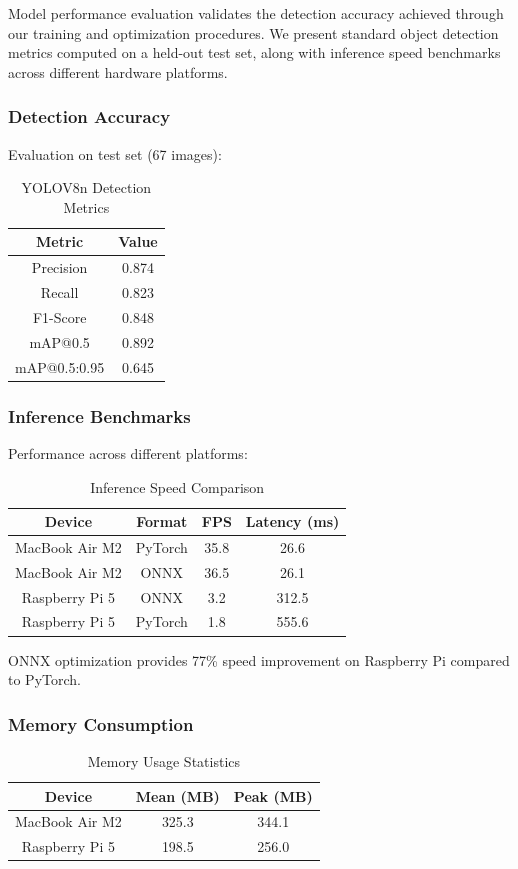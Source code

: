 \documentclass{ieeeaccess}
\begin{document}
Model performance evaluation validates the detection accuracy achieved through our training and optimization procedures. We present standard object detection metrics computed on a held-out test set, along with inference speed benchmarks across different hardware platforms.

\subsubsection{Detection Accuracy}
Evaluation on test set (67 images):
\begin{table}[h]
\caption{YOLOV8n Detection Metrics}
\centering
\begin{tabular}{@{}cc@{}}
\toprule
\textbf{Metric} & \textbf{Value} \\ \midrule
Precision & 0.874 \\
Recall & 0.823 \\
F1-Score & 0.848 \\
mAP@0.5 & 0.892 \\
mAP@0.5:0.95 & 0.645 \\ \bottomrule
\end{tabular}
\end{table}

\subsubsection{Inference Benchmarks}
Performance across different platforms:
\begin{table}[h]
\caption{Inference Speed Comparison}
\centering
\begin{tabular}{@{}cccc@{}}
\toprule
\textbf{Device} & \textbf{Format} & \textbf{FPS} & \textbf{Latency (ms)} \\ \midrule
MacBook Air M2 & PyTorch & 35.8 & 26.6 \\
MacBook Air M2 & ONNX & 36.5 & 26.1 \\
Raspberry Pi 5 & ONNX & 3.2 & 312.5 \\
Raspberry Pi 5 & PyTorch & 1.8 & 555.6 \\ \bottomrule
\end{tabular}
\end{table}

ONNX optimization provides 77\% speed improvement on Raspberry Pi compared to PyTorch.

\subsubsection{Memory Consumption}
\begin{table}[h]
\caption{Memory Usage Statistics}
\centering
\begin{tabular}{@{}ccc@{}}
\toprule
\textbf{Device} & \textbf{Mean (MB)} & \textbf{Peak (MB)} \\ \midrule
MacBook Air M2 & 325.3 & 344.1 \\
Raspberry Pi 5 & 198.5 & 256.0 \\ \bottomrule
\end{tabular}
\end{table}
\end{document}
